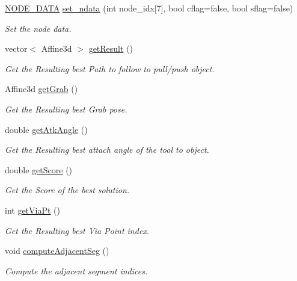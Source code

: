 \begin{DoxyCompactItemize}
\hyperlink{structNODE__DATA}{N\+O\+D\+E\+\_\+\+D\+A\+TA} \hyperlink{classMCT__Search2_aef5e7c7dd2c7184c021e969d6d0881a9}{set\+\_\+ndata} (int node\+\_\+idx\mbox{[}7\mbox{]}, bool cflag=false, bool sflag=false)
\begin{DoxyCompactList}\small\item\em Set the node data. \end{DoxyCompactList}\item 
vector$<$ Affine3d $>$ \hyperlink{classMCT__Search2_aa20bc38f16b562fcd6ece9605e371a30}{get\+Result} ()
\begin{DoxyCompactList}\small\item\em Get the Resulting best Path to follow to pull/push object. \end{DoxyCompactList}\item 
Affine3d \hyperlink{classMCT__Search2_a31bf88e51a19581db4957c73fc2d8a6b}{get\+Grab} ()
\begin{DoxyCompactList}\small\item\em Get the Resulting best Grab pose. \end{DoxyCompactList}\item 
double \hyperlink{classMCT__Search2_ae8ae2613e785dbcd18e861b12877c3a3}{get\+Atk\+Angle} ()
\begin{DoxyCompactList}\small\item\em Get the Resulting best attach angle of the tool to object. \end{DoxyCompactList}\item 
double \hyperlink{classMCT__Search2_a8cf59fa0e37982592de526ce450d1331}{get\+Score} ()
\begin{DoxyCompactList}\small\item\em Get the Score of the best solution. \end{DoxyCompactList}\item 
int \hyperlink{classMCT__Search2_a34c5b319ed38d852d2bbeadb80fe41e2}{get\+Via\+Pt} ()
\begin{DoxyCompactList}\small\item\em Get the Resulting best Via Point index. \end{DoxyCompactList}\item 
\mbox{\label{classMCT__Search2_a2cbaa67d3a44d77bbf2d9d378eb38c4c}} 
void \hyperlink{classMCT__Search2_a2cbaa67d3a44d77bbf2d9d378eb38c4c}{compute\+Adjacent\+Seg} ()
\begin{DoxyCompactList}\small\item\em Compute the adjacent segment indices. \end{DoxyCompactList}\end{DoxyCompactItemize}
